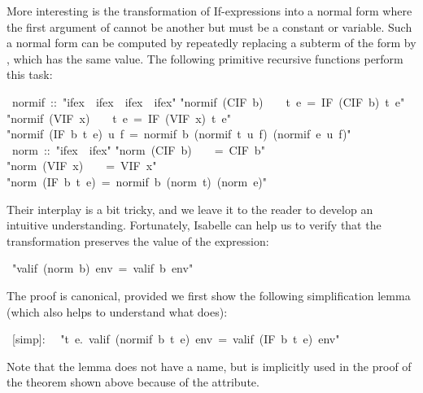 \begin{isabelle}
\begin{isamarkuptext}
More interesting is the transformation of If-expressions into a normal form
where the first argument of  cannot be another  but
must be a constant or variable. Such a normal form can be computed by
repeatedly replacing a subterm of the form  by
, which has the same value. The following
primitive recursive functions perform this task:%
\end{isamarkuptext}%
\ normif\ ::\ {"}ifex\ {\isasymRightarrow}\ ifex\ {\isasymRightarrow}\ ifex\ {\isasymRightarrow}\ ifex{"}\isanewline
{}\isanewline
{"}normif\ (CIF\ b)\ \ \ \ t\ e\ =\ IF\ (CIF\ b)\ t\ e{"}\isanewline
{"}normif\ (VIF\ x)\ \ \ \ t\ e\ =\ IF\ (VIF\ x)\ t\ e{"}\isanewline
{"}normif\ (IF\ b\ t\ e)\ u\ f\ =\ normif\ b\ (normif\ t\ u\ f)\ (normif\ e\ u\ f){"}\isanewline
\isanewline
{}\ norm\ ::\ {"}ifex\ {\isasymRightarrow}\ ifex{"}\isanewline
{}\isanewline
{"}norm\ (CIF\ b)\ \ \ \ =\ CIF\ b{"}\isanewline
{"}norm\ (VIF\ x)\ \ \ \ =\ VIF\ x{"}\isanewline
{"}norm\ (IF\ b\ t\ e)\ =\ normif\ b\ (norm\ t)\ (norm\ e){"}%
\begin{isamarkuptext}%
\noindent
Their interplay is a bit tricky, and we leave it to the reader to develop an
intuitive understanding. Fortunately, Isabelle can help us to verify that the
transformation preserves the value of the expression:%
\end{isamarkuptext}%
\ {"}valif\ (norm\ b)\ env\ =\ valif\ b\ env{"}%
\begin{isamarkuptext}%
\noindent
The proof is canonical, provided we first show the following simplification
lemma (which also helps to understand what  does):%
\end{isamarkuptext}%
\ [simp]:\isanewline
\ \ {"}{\isasymforall}t\ e.\ valif\ (normif\ b\ t\ e)\ env\ =\ valif\ (IF\ b\ t\ e)\ env{"}%
\begin{isamarkuptext}%
\noindent
Note that the lemma does not have a name, but is implicitly used in the proof
of the theorem shown above because of the \isa{[simp]} attribute.


\end{isamarkuptext}
\end{isabelle}
